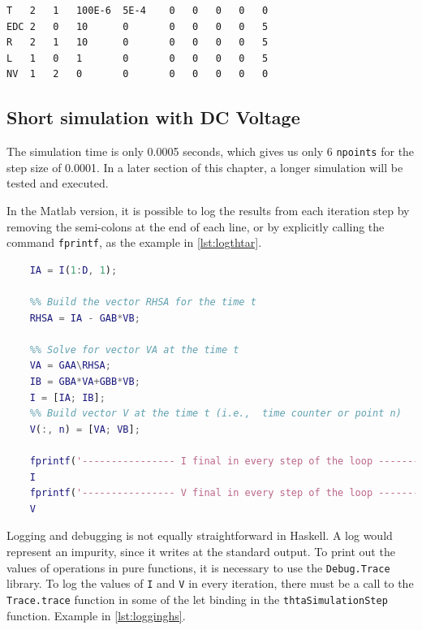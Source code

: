 \begin{lstlisting}[language=bash, label=getinfo, caption={Original input data file for ETR-P Matlab}, captionpos=b, label={lst:inputthtar}]
T   2   1   100E-6  5E-4    0   0   0   0   0
EDC 2   0   10      0       0   0   0   0   5
R   2   1   10      0       0   0   0   0   5
L   1   0   1       0       0   0   0   0   5
NV  1   2   0       0       0   0   0   0   0
\end{lstlisting}


\subsection{ Short simulation with DC Voltage}

The simulation time is only 0.0005 seconds, which gives us only 6 \lstinline!npoints! for the step size of 0.0001. In a later section of this chapter, a longer simulation will be tested and executed.

In the Matlab version, it is possible to log the results from each iteration step by removing the semi-colons at the end of each line, or by explicitly calling the command \lstinline!fprintf!, as the example in \cref{lst:logthtar}.

\begin{lstlisting}[language=Matlab, label=getinfo, caption={Logging the results of V and I at the end of each iteration in Matlab}, captionpos=b, label={lst:logthtar}]
%% Build vector IA for the time t
    IA = I(1:D, 1);
    
    %% Build the vector RHSA for the time t
    RHSA = IA - GAB*VB;
    
    %% Solve for vector VA at the time t
    VA = GAA\RHSA;
    IB = GBA*VA+GBB*VB;
    I = [IA; IB];
    %% Build vector V at the time t (i.e.,  time counter or point n)
    V(:, n) = [VA; VB];
    
    fprintf('---------------- I final in every step of the loop -----------\n');
    I
    fprintf('---------------- V final in every step of the loop -----------\n');
    V
\end{lstlisting}

Logging and debugging is not equally straightforward in Haskell. A log would represent an impurity, since it writes at the standard output. To print out the values of operations in pure functions, it is necessary to use the \lstinline!Debug.Trace! library. To log the values of \lstinline!I! and \lstinline!V! in every iteration, there must be a call to the \lstinline!Trace.trace! function in some of the let binding in the \lstinline!thtaSimulationStep! function. Example in \cref{lst:logginghs}.

